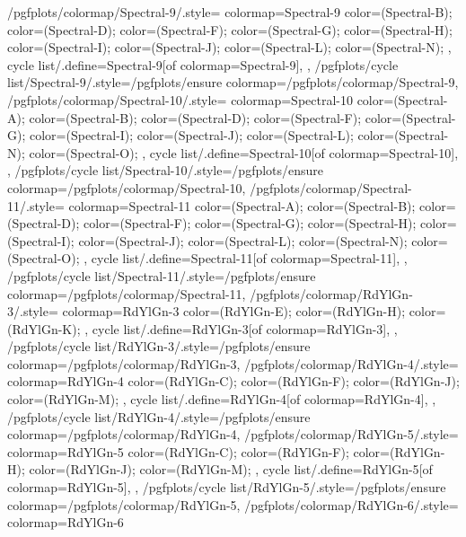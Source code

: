 {  %
  /pgfplots/colormap/Spectral-9/.style={
    colormap={Spectral-9}{
      color=(Spectral-B);
      color=(Spectral-D);
      color=(Spectral-F);
      color=(Spectral-G);
      color=(Spectral-H);
      color=(Spectral-I);
      color=(Spectral-J);
      color=(Spectral-L);
      color=(Spectral-N);
    },
    cycle list/.define={Spectral-9}{[of colormap=Spectral-9]},
  },
  /pgfplots/cycle list/Spectral-9/.style={/pgfplots/ensure colormap={/pgfplots/colormap/Spectral-9}},
  /pgfplots/colormap/Spectral-10/.style={
    colormap={Spectral-10}{
      color=(Spectral-A);
      color=(Spectral-B);
      color=(Spectral-D);
      color=(Spectral-F);
      color=(Spectral-G);
      color=(Spectral-I);
      color=(Spectral-J);
      color=(Spectral-L);
      color=(Spectral-N);
      color=(Spectral-O);
    },
    cycle list/.define={Spectral-10}{[of colormap=Spectral-10]},
  },
  /pgfplots/cycle list/Spectral-10/.style={/pgfplots/ensure colormap={/pgfplots/colormap/Spectral-10}},
  /pgfplots/colormap/Spectral-11/.style={
    colormap={Spectral-11}{
      color=(Spectral-A);
      color=(Spectral-B);
      color=(Spectral-D);
      color=(Spectral-F);
      color=(Spectral-G);
      color=(Spectral-H);
      color=(Spectral-I);
      color=(Spectral-J);
      color=(Spectral-L);
      color=(Spectral-N);
      color=(Spectral-O);
    },
    cycle list/.define={Spectral-11}{[of colormap=Spectral-11]},
  },
  /pgfplots/cycle list/Spectral-11/.style={/pgfplots/ensure colormap={/pgfplots/colormap/Spectral-11}},
  /pgfplots/colormap/RdYlGn-3/.style={
    colormap={RdYlGn-3}{
      color=(RdYlGn-E);
      color=(RdYlGn-H);
      color=(RdYlGn-K);
    },
    cycle list/.define={RdYlGn-3}{[of colormap=RdYlGn-3]},
  },
  /pgfplots/cycle list/RdYlGn-3/.style={/pgfplots/ensure colormap={/pgfplots/colormap/RdYlGn-3}},
  /pgfplots/colormap/RdYlGn-4/.style={
    colormap={RdYlGn-4}{
      color=(RdYlGn-C);
      color=(RdYlGn-F);
      color=(RdYlGn-J);
      color=(RdYlGn-M);
    },
    cycle list/.define={RdYlGn-4}{[of colormap=RdYlGn-4]},
  },
  /pgfplots/cycle list/RdYlGn-4/.style={/pgfplots/ensure colormap={/pgfplots/colormap/RdYlGn-4}},
  /pgfplots/colormap/RdYlGn-5/.style={
    colormap={RdYlGn-5}{
      color=(RdYlGn-C);
      color=(RdYlGn-F);
      color=(RdYlGn-H);
      color=(RdYlGn-J);
      color=(RdYlGn-M);
    },
    cycle list/.define={RdYlGn-5}{[of colormap=RdYlGn-5]},
  },
  /pgfplots/cycle list/RdYlGn-5/.style={/pgfplots/ensure colormap={/pgfplots/colormap/RdYlGn-5}},
  /pgfplots/colormap/RdYlGn-6/.style={
    colormap={RdYlGn-6}{
}}}

